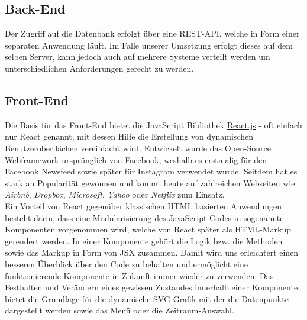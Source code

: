 \documentclass{article}
\begin{document}




\subsection{Back-End}
Der Zugriff auf die Datenbank erfolgt über eine REST-API, welche in Form einer separaten Anwendung läuft.
Im Falle unserer Umsetzung erfolgt dieses auf dem selben Server, kann jedoch auch auf mehrere Systeme verteilt werden um unterschiedlichen Anforderungen gerecht zu werden.

\subsection{Front-End}
Die Basis für das Front-End bietet die JavaScript Bibliothek \href{https://reactjs.org}{React.js} - oft einfach nur React genannt, mit dessen Hilfe die Erstellung von dynamischen Benutzeroberflächen vereinfacht wird.
Entwickelt wurde das Open-Source Webframework ursprünglich von Facebook, weshalb es erstmalig für den Facebook Newsfeed sowie später für Instagram verwendet wurde.
Seitdem hat es stark an Popularität gewonnen und kommt heute auf zahlreichen Webseiten wie \textit{Airbnb}, \textit{Dropbox}, \textit{Microsoft}, \textit{Yahoo} oder \textit{Netflix} zum Einsatz.\\

Ein Vorteil von React gegenüber klassischen HTML basierten Anwendungen besteht darin, dass eine Modularisierung des JavaScript Codes in sogenannte Komponenten vorgenommen wird, welche von React später als HTML-Markup gerendert werden. In einer Komponente gehört die Logik bzw. die Methoden sowie das Markup in Form von JSX zusammen. Damit wird uns erleichtert einen besseren Überblick über den Code zu behalten und ermöglicht eine funktionierende Komponente in Zukunft immer wieder zu verwenden. Das Festhalten und Verändern eines gewissen Zustandes innerhalb einer Komponente, bietet die Grundlage für die dynamische SVG-Grafik mit der die Datenpunkte dargestellt werden sowie das Menü oder die Zeitraum-Auswahl.\\
\end{document}
